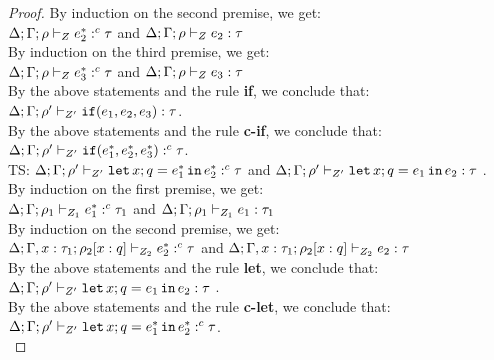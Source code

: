 \begin{proof}
    By induction on the second premise, we get: \\
    $ \Delta; \Gamma; \rho \vdash_{ Z} { e_2^*} :^c  \tau   $ and $  \Delta; \Gamma; \rho \vdash_{Z} e_2 : \tau  $ \\
    By induction on the third premise, we get: \\
    $ \Delta; \Gamma; \rho \vdash_{ Z} { e_3^*} :^c  \tau   $ and $  \Delta; \Gamma; \rho \vdash_{Z} e_3 : \tau  $ \\
    By the above statements and the rule \textbf{if}, we conclude that: 
     $     \Delta; \Gamma; \rho' \vdash_{Z'} \mathtt{if}(e_1, e_2, e_3):  \tau  $.\\
      By the above statements and the rule \textbf{c-if}, we conclude that: 
    $  \Delta; \Gamma; \rho' \vdash_{ Z'} { \mathtt{if}(e_1^*, e_2^*, e_3^*)} :^c  \tau  $.\\ 

    TS: $  \Delta; \Gamma; \rho' \vdash_{ Z'} { \mathop{\mathtt{let}} x;q = e_1^* \mathop{ \mathtt{in}} e_2^* } :^c  \tau  $ and $   \Delta; \Gamma; \rho' \vdash_{Z'}  \mathop{\mathtt{let}} x;q = e_1 \mathop{ \mathtt{in}} e_2:  \tau $ .\\
    By induction on the first premise, we get: \\
    $ \Delta; \Gamma; \rho_1 \vdash_{ Z_1} { e_1^*} :^c  \tau_1   $ and $  \Delta; \Gamma; \rho_1 \vdash_{Z_1} e_1 : \tau_1  $ \\
    By induction on the second premise, we get: \\
    $  \Delta; \Gamma, x:\tau_1 ; \rho_2[x:q] \vdash_{ Z_2} { e_2^*} :^c  \tau   $ and $  \Delta; \Gamma, x:\tau_1 ; \rho_2[x:q] \vdash_{Z_2} e_2 : \tau  $ \\
    By the above statements and the rule \textbf{let}, we conclude that: 
     $   \Delta; \Gamma; \rho' \vdash_{Z'}  \mathop{\mathtt{let}} x;q = e_1 \mathop{ \mathtt{in}} e_2:  \tau $ .\\
      By the above statements and the rule \textbf{c-let}, we conclude that: 
   $  \Delta; \Gamma; \rho' \vdash_{ Z'} { \mathop{\mathtt{let}} x;q = e_1^* \mathop{ \mathtt{in}} e_2^* } :^c  \tau  $.\\ 

\end{proof}



